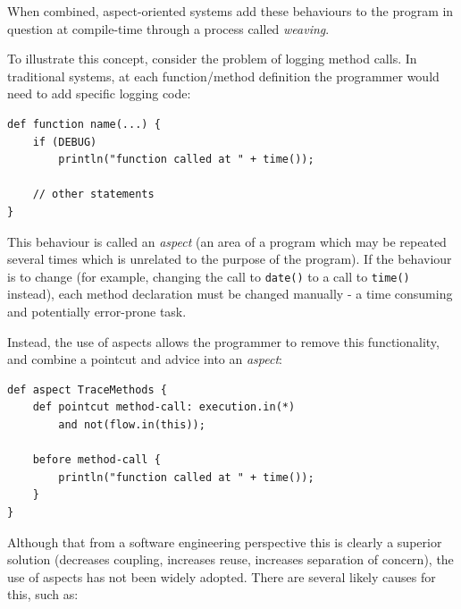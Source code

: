 	When combined, aspect-oriented systems add these behaviours to the program in question at compile-time through a process called \textit{weaving}.
	
	To illustrate this concept, consider the problem of logging method calls. In traditional systems, at each function/method definition the programmer would need to add specific logging code:
	
	\begin{lstlisting}[caption=Traditional use of advice in programs,label=lst:tradadvice]
def function name(...) {
    if (DEBUG)
        println("function called at " + time());
      
    // other statements
}\end{lstlisting}
	
	This behaviour is called an \textit{aspect} (an area of a program which may be repeated several times which is unrelated to the purpose of the program). If the behaviour is to change (\eg for example, changing the call to \texttt{date()} to a call to \texttt{time()} instead), each method declaration must be changed manually - a time consuming and potentially error-prone task.
	
	Instead, the use of aspects allows the programmer to remove this functionality, and combine a pointcut and advice into an \textit{aspect}:
	
	\begin{lstlisting}[caption=AOP-based advice equivalent to listing \ref{lst:tradadvice},label=lst:aopadvice]
def aspect TraceMethods {
    def pointcut method-call: execution.in(*)
        and not(flow.in(this));
		
    before method-call {
        println("function called at " + time());
    }
}\end{lstlisting}
	
	Although that from a software engineering perspective this is clearly a superior solution (decreases coupling, increases reuse, increases separation of concern), the use of aspects has not been widely adopted. There are several likely causes for this, such as:
	
